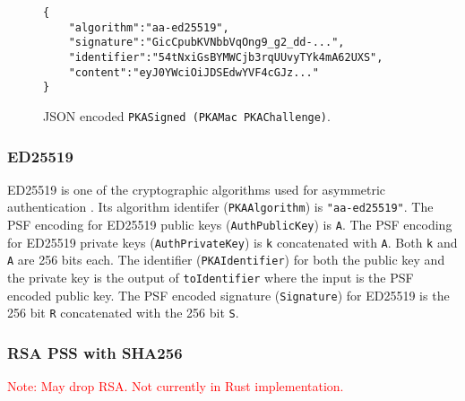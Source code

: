 \documentclass{article}
\newcommand{\todo}[1]{\textcolor{red}{#1}}
\begin{document}
\begin{figure}
\begin{lstlisting}
{
    "algorithm":"aa-ed25519",
    "signature":"GicCpubKVNbbVqOng9_g2_dd-...",
    "identifier":"54tNxiGsBYMWCjb3rqUUvyTYk4mA62UXS",
    "content":"eyJ0YWciOiJDSEdwYVF4cGJz..."
}
\end{lstlisting}
\caption{JSON encoded \texttt{PKASigned (PKAMac PKAChallenge)}.}
\label{code:pkasignedmacchallenge}
\end{figure}

\subsubsection{ED25519}


ED25519 is one of the cryptographic algorithms used for asymmetric authentication \cite{rfc8032}. 
Its algorithm identifer (\texttt{PKAAlgorithm}) is \texttt{"aa-ed25519"}. 
The PSF encoding for ED25519 public keys (\texttt{AuthPublicKey}) is \texttt{A}. 
The PSF encoding for ED25519 private keys (\texttt{AuthPrivateKey}) is \texttt{k} concatenated with \texttt{A}. 
Both \texttt{k} and \texttt{A} are 256 bits each. 
The identifier (\texttt{PKAIdentifier}) for both the public key and the private key is the output of \texttt{toIdentifier} where the input is the PSF encoded public key. 
The PSF encoded signature (\texttt{Signature}) for ED25519 is the 256 bit \texttt{R} concatenated with the 256 bit \texttt{S}.









\subsubsection{RSA PSS with SHA256}
\label{sec:rsapss}

\todo{Note: May drop RSA. Not currently in Rust implementation.}
\end{document}
